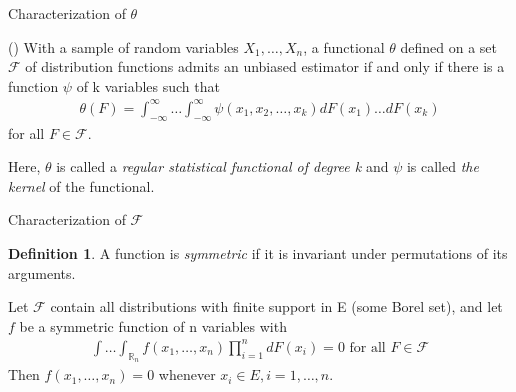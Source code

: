 \documentclass{beamer}
\newcommand{\R}{{\mathbb{R}}}
\theoremstyle{definition}
\newtheorem{Def}{Definition}
\numberwithin{Def}{section}
\begin{document}
\begin{frame}{Characterization of $\theta$}

  \begin{theorem}
(\cite{halmos1946theory}) With a sample of random variables $X_1, \dotsc, X_n$, a functional $\theta$ defined on a set $\mathcal{F}$ of distribution functions admits an unbiased estimator if and only if there is a function $\psi$ of k variables such that 
\begin{align}\label{unbiased_est}
    \theta(F) = \int_{-\infty}^{\infty} \dotsc \int_{-\infty}^{\infty} \psi(x_1, x_2, \dotsc, x_k)dF(x_1) \dotsc dF(x_k)
\end{align}
for all $F \in \mathcal{F}$.
\end{theorem}
    Here, $\theta$ is called a \textit{regular statistical functional of degree k} and $\psi$ is called \textit{the kernel} of the functional. 
 
\end{frame}

\begin{frame}{Characterization of $\mathcal{F}$}
\begin{Def}
A function is \textit{symmetric} if it is invariant under permutations of its arguments. 
\end{Def}

\pause
\begin{Lemma}\label{lemA}
Let $\mathcal{F}$ contain all distributions with finite support in E (some Borel set), and let $f$ be a symmetric function of n variables with 
    \begin{align*}
        \int \dotsc \int_{\R_n} f(x_1, \dotsc, x_n) \prod_{i=1}^n dF(x_i) = 0 \text{ for all } F \in \mathcal{F}
    \end{align*}
    Then $f(x_1, \dotsc, x_n) = 0$ whenever $x_i \in E, i = 1, \dotsc, n$. 
\end{Lemma}
\end{frame}
\end{document}

